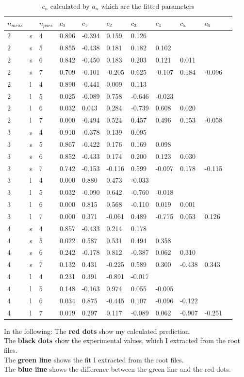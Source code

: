 \documentclass[a4paper,12pt]{article}
\begin{document}
\begin{table}[H]
    \begin{tabular}{|l|l|l|l|l|l|l|l|l|l|l|}
        \hline
        $n_{meas}$&&$n_{pars}$&$c_0$ & $c_1$& $c_2$ & $c_3$ & $c_4$ & $c_5$ & $c_6$\\
        \hline
        2&s&4&0.896&-0.394&0.159&0.126\\
        2&s&5&0.855&-0.438&0.181&0.182&0.102\\
        2&s&6&0.842&-0.450&0.183&0.203&0.121&0.011\\
        2&s&7&0.709&-0.101&-0.205&0.625&-0.107&0.184&-0.096\\
        2&l&4&0.890&-0.441&0.009&0.113\\
        2&l&5&0.025&-0.089&0.758&-0.646&-0.023\\
        2&l&6&0.032&0.043&0.284&-0.739&0.608&0.020\\
        2&l&7&0.000&-0.494&0.524&0.457&0.496&0.153&-0.058\\
        3&s&4&0.910&-0.378&0.139&0.095\\
        3&s&5&0.867&-0.422&0.176&0.169&0.098\\
        3&s&6&0.852&-0.433&0.174&0.200&0.123&0.030\\
        3&s&7&0.742&-0.153&-0.116&0.599&-0.097&0.178&-0.115\\
        3&l&4&0.000&0.880&0.473&-0.033\\
        3&l&5&0.032&-0.090&0.642&-0.760&-0.018\\
        3&l&6&0.000&0.815&0.568&-0.110&0.019&0.001\\
        3&l&7&0.000&0.371&-0.061&0.489&-0.775&0.053&0.126\\
        4&s&4&0.857&-0.433&0.214&0.178\\
        4&s&5&0.022&0.587&0.531&0.494&0.358\\
        4&s&6&0.242&-0.178&0.812&-0.387&0.062&0.310\\
        4&s&7&0.132&0.431&-0.225&0.589&0.300&-0.438&0.343\\
        4&l&4&0.231&0.391&-0.891&-0.017\\
        4&l&5&0.148&-0.163&0.974&0.055&-0.005\\
        \rowcolor{green!20} %
        4&l&6&0.034&0.875&-0.445&0.107&-0.096&-0.122\\
        4&l&7&0.019&0.297&0.117&-0.089&0.062&-0.907&-0.251\\
        \hline
    \end{tabular}
    \caption{$c_n$ calculated by $a_n$ which are the fitted parameters}
\end{table}
\noindent In the following:
The \textbf{red dots} show my calculated prediction.\\
The \textbf{black dots} show the experimental values, which I extracted from the root files.\\
The \textbf{green line} shows the fit I extracted from the root files.\\
The \textbf{blue line} shows the difference between the green line and the red dots.
\end{document}
